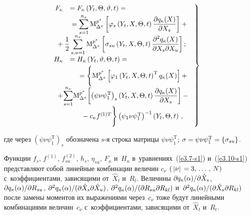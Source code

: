 \begin{multicols}{2}
\noindent
\begin{equation}
\left.
\begin{array}{rl}
 \hspace*{-2mm}F_\kappa &= F_\kappa \left(Y_t,\Theta,\vartheta,t\right) ={}\\[3pt]
 &{}=\displaystyle\sss_{s=1}^{n_x}
   \mm_{\Delta^x}^{p^*} \left[ \varphi_s \left(Y_t,X,\Theta,t\right)
   \fr{\partial q_\kappa (X)}{\partial X_s}\right]+{}\\[5pt]
&\hspace*{-7mm}{}+\fr{1}{2} \displaystyle\sss_{s,u=1}^{n_x}
     \mm_{\Delta^x}^{p^*}\lk \si_{su} \left(Y_t,X,\Theta,t\right)\fr{\partial^2 q_\kappa
    (X)}{\partial X_s\partial X_u}\rk;
   \\[5pt]
   \hspace*{-2mm}H_\kappa &= H_\kappa \left(Y_t,\vartheta,\Theta,t\right) ={}\\[3pt]
  & \hspace*{4mm}{}=
   \Bigg\{  \mm_{\Delta^x}^{p^*}
   \lk \varphi_1 \left(Y_t,X,\Theta,t\right)^{\mathrm{T}} q_\kappa (X)\rk+{}\\[5pt]
&\left.\hspace*{-7.5mm}{}+ \displaystyle\!\sss_{s=1}^{n_x}\!
     \mm_{\Delta^x}^{p^*}\!\lk \left(\psi\nu\psi_1^{\mathrm{T}}\right)_s 
     \left(Y_t,X,\Theta,t\right) \fr{\partial
    q_\kappa (X)}{\partial X_s} \rk-{}\right.\\[5pt]
&    \hspace*{6mm}{}- c_\kappa
    f^{(1)T} \Bigg\} \left(\psi_1\nu\psi_1^{\mathrm{T}}\right)^{-1} \left(Y_t,\Theta,t\right)\,,
    \end{array}
    \right\}
    \label{e3.11-s1}
    \end{equation}
    
    \vspace*{-2pt}

\noindent
где через $(\psi\nu\psi_1^{\mathrm{T}})_s$ обозначена  $s$-я строка матрицы
$\psi\nu\psi_1^{\mathrm{T}}$; $\si\hm=\psi\nu\psi_1^{\mathrm{T}} \hm=\lf \si_{su}\rf$.

Функции  $f_s$, $f^{(1)}$, $f^{(2)}_{su}$, $h_s$, $\eta_{su}$, $F_\kappa$ 
и~$H_\kappa$ в~уравнениях~(\ref{e3.7-s1}) и~(\ref{e3.10-s1}) представляют
собой линейные комбинации величин  $c_\nu$ $(\lv\nu\rv \hm= 3\tr N)$
с~коэффициентами, зависящими от~$\hat X_t$ и~$R_t$. Величины
$\partial q_\kappa (\alpha)/\partial \hat X_s$, $\partial q_\kappa
(\alpha)/\partial R_{su}$, $\partial^2 q_\kappa (\alpha)/(\partial \hat
X_s \partial \hat X_u)$, $\partial^2 q_\kappa (\alpha)/(\partial
R_{su} \partial R_{kl})$ и~$\partial^2 q_\kappa (\alpha)/(\partial \hat
X_s \partial R_{kl})$ после замены моментов их выражениями
через~$c_\nu$ тоже будут линейными комбинациями величин~$c_\nu$ 
с~коэффициентами, зависящими от~$\hat X_t$ и~$R_t$.


\end{multicols}
